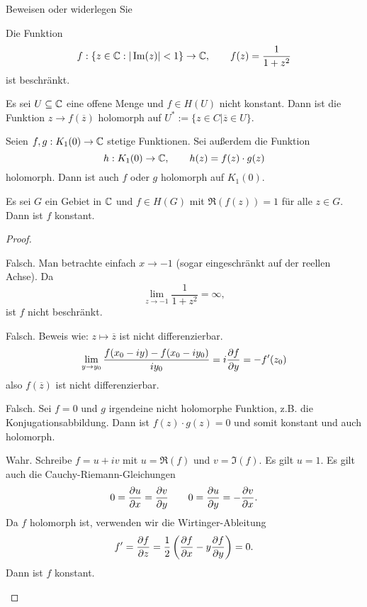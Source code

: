 \begin{Problem}
	Beweisen oder widerlegen Sie
	\begin{parts}
		\item Die Funktion
			\[
			f: \{z\in \mathbb{C}:|\Im(z)|<1\} \to \mathbb{C},\qquad f(z)=\frac{1}{1+z^2}
		\]
		ist beschr\"{a}nkt.
	\item Es sei $U\subseteq \mathbb{C}$ eine offene Menge und $f\in H(U)$ nicht konstant. Dann ist die Funktion $z\to f(\overline{z})$ holomorph auf $U^*:=\{z\in C|\overline{z}\in U\} $.
	\item Seien $f,g:K_1(0)\to \mathbb{C}$ stetige Funktionen. Sei außerdem die Funktion
		 \[
		h:K_1(0)\to \mathbb{C},\qquad h(z)=f(z)\cdot g(z)
	\]
	holomorph. Dann ist auch $f$ oder $g$ holomorph auf $K_1(0)$.
\item Es sei $G$ ein Gebiet in $\mathbb{C}$ und $f\in H(G)$ mit $\Re(f(z))=1$ f\"{u}r alle $z\in G$. Dann ist $f$ konstant.
	\end{parts}
\end{Problem}

\begin{proof}
	\begin{parts}
	\item Falsch. Man betrachte einfach $x\to -1$ (sogar eingeschränkt auf der reellen Achse). Da
		\[
		\lim_{z \to -1} \frac{1}{1+z^2}=\infty
	,\]
	ist $f$ nicht beschränkt.
\item Falsch. Beweis wie: $z\mapsto \overline{z}$ ist nicht differenzierbar.
\[
	\lim_{y \to y_0} \frac{f(x_0-iy)-f(x_0-i y_0)}{iy_0}=i \pdv{f}{y}=-f'(z_0)
\]
also $f(\overline{z})$ ist nicht differenzierbar.
\item Falsch. Sei $f=0$ und $g$ irgendeine nicht holomorphe Funktion, z.B. die Konjugationsabbildung. Dann ist $f(z)\cdot g(z)=0$ und somit konstant und auch holomorph. 
\item Wahr. Schreibe $f=u+iv$ mit $u=\Re(f)$ und $v=\Im(f)$. Es gilt $u=1$. Es gilt auch die Cauchy-Riemann-Gleichungen
	\[
		0=\pdv{u}{x}=\pdv{v}{y}\qquad 0=\pdv{u}{y}=-\pdv{v}{x}
	.\] 
	Da $f$ holomorph ist, verwenden wir die Wirtinger-Ableitung
	\[
		f'=\pdv{f}{z}=\frac{1}{2}\left( \pdv{f}{x}-y\pdv{f}{y} \right) =0
	.\] 
	Dann ist $f$ konstant.\qedhere
	\end{parts}
\end{proof}

